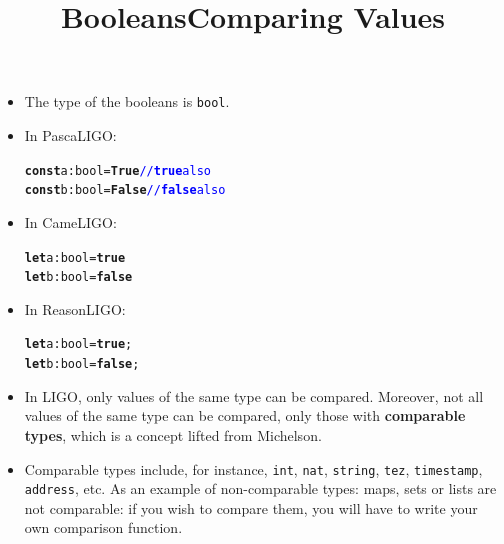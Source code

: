 \documentclass[wide]{slides}
\newcommand{\Kconst}[0]{\textbf{const}\xspace}
\newcommand{\KFalse}[0]{\textbf{False}\xspace}
\newcommand{\KTrue}[0]{\textbf{True}\xspace}
\newcommand{\Kfalse}[0]{\textbf{false}\xspace}
\newcommand{\Klet}[0]{\textbf{let}\xspace}
\newcommand{\Ktrue}[0]{\textbf{true}\xspace}
\newcommand{\com}[1]{\textcolor{blue}{{#1}}}
\begin{document}
\begin{slide}
  \title{Booleans}

  \begin{itemize}

    \item The type of the booleans is \texttt{bool}.

    \item In PascaLIGO:
      \begin{alltt}
\Kconst a : bool = \KTrue   \com{// \Ktrue also}
\Kconst b : bool = \KFalse  \com{// \Kfalse also}
      \end{alltt}

    \item In CameLIGO:
      \begin{alltt}
\Klet a : bool = \Ktrue
\Klet b : bool = \Kfalse
      \end{alltt}

    \item In ReasonLIGO:
      \begin{alltt}
\Klet a : bool = \Ktrue;
\Klet b : bool = \Kfalse;
      \end{alltt}

  \end{itemize}

\end{slide}

\begin{slide}
  \title{Comparing Values}

  \begin{itemize}

    \item In LIGO, only values of the same type can be
      compared. Moreover, not all values of the same type can be
      compared, only those with \textbf{comparable types}, which is a
      concept lifted from Michelson.

    \item Comparable types include, for instance, \texttt{int},
      \texttt{nat}, \texttt{string}, \texttt{tez}, \texttt{timestamp},
      \texttt{address}, etc. As an example of non-comparable types:
      maps, sets or lists are not comparable: if you wish to compare
      them, you will have to write your own comparison function.

  \end{itemize}

\end{slide}
\end{document}

